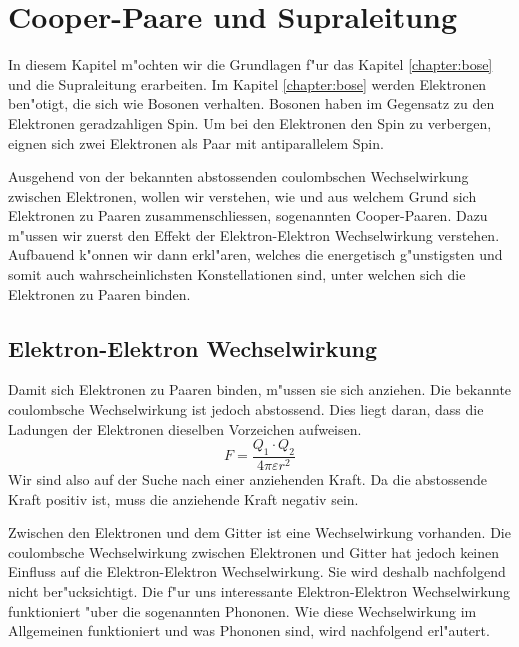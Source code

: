 \chapter{Cooper-Paare und Supraleitung\label{chapter:supraleitung}}
\begin{refsection}

In diesem Kapitel m"ochten wir die Grundlagen f"ur das Kapitel \ref{chapter:bose} und
die Supraleitung erarbeiten. Im Kapitel \ref{chapter:bose} werden Elektronen ben"otigt,
die sich wie  Bosonen verhalten. Bosonen haben im Gegensatz zu den Elektronen
geradzahligen Spin. Um bei den Elektronen den Spin zu verbergen, eignen sich zwei Elektronen als Paar mit
antiparallelem Spin.

Ausgehend von der bekannten abstossenden coulombschen Wechselwirkung zwischen Elektronen,
wollen wir verstehen, wie und aus welchem Grund sich Elektronen zu Paaren zusammenschliessen,
sogenannten  Cooper-Paaren.
Dazu m"ussen wir zuerst den Effekt der Elektron-Elektron Wechselwirkung verstehen.
Aufbauend k"onnen wir dann erkl"aren, welches die energetisch g"unstigsten und somit auch
wahrscheinlichsten Konstellationen sind, unter welchen sich die Elektronen zu Paaren binden.

\section{Elektron-Elektron Wechselwirkung\label{supraleitung:elektronelektronwechselwirkung}}
Damit sich Elektronen zu Paaren binden, m"ussen sie sich anziehen.
Die bekannte coulombsche Wechselwirkung ist jedoch abstossend.
Dies liegt daran, dass die Ladungen der Elektronen dieselben Vorzeichen aufweisen.
\begin{equation}
F = \frac{Q_1\cdot Q_2}{4\pi \varepsilon r^2}
\label{supraleitung:Coulomb}
\end{equation}
Wir sind also auf der Suche nach einer anziehenden Kraft.
Da die abstossende Kraft positiv ist, muss die anziehende Kraft negativ sein.

Zwischen den Elektronen und dem Gitter ist eine Wechselwirkung vorhanden.
Die coulombsche Wechselwirkung zwischen Elektronen und Gitter hat jedoch keinen Einfluss auf die
Elektron-Elektron Wechselwirkung.
Sie wird deshalb nachfolgend nicht ber"ucksichtigt.
Die f"ur uns interessante Elektron-Elektron Wechselwirkung funktioniert "uber die sogenannten Phononen.
Wie diese Wechselwirkung im Allgemeinen funktioniert und was Phononen sind, wird nachfolgend erl"autert.


\end{refsection}
